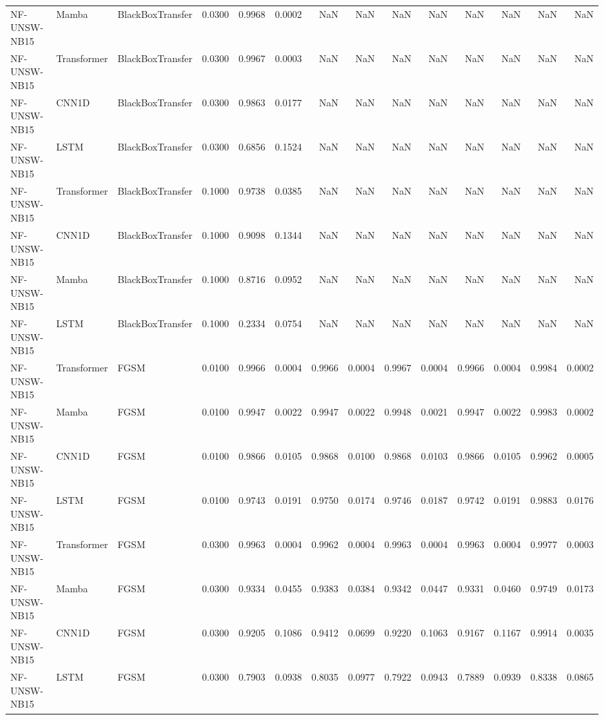 \begin{table}[ht]
\begin{tabular}{lllrrrrrrrrrrr}
NF-UNSW-NB15 & Mamba & BlackBoxTransfer & 0.0300 & 0.9968 & 0.0002 & NaN & NaN & NaN & NaN & NaN & NaN & NaN & NaN \\
NF-UNSW-NB15 & Transformer & BlackBoxTransfer & 0.0300 & 0.9967 & 0.0003 & NaN & NaN & NaN & NaN & NaN & NaN & NaN & NaN \\
NF-UNSW-NB15 & CNN1D & BlackBoxTransfer & 0.0300 & 0.9863 & 0.0177 & NaN & NaN & NaN & NaN & NaN & NaN & NaN & NaN \\
NF-UNSW-NB15 & LSTM & BlackBoxTransfer & 0.0300 & 0.6856 & 0.1524 & NaN & NaN & NaN & NaN & NaN & NaN & NaN & NaN \\
NF-UNSW-NB15 & Transformer & BlackBoxTransfer & 0.1000 & 0.9738 & 0.0385 & NaN & NaN & NaN & NaN & NaN & NaN & NaN & NaN \\
NF-UNSW-NB15 & CNN1D & BlackBoxTransfer & 0.1000 & 0.9098 & 0.1344 & NaN & NaN & NaN & NaN & NaN & NaN & NaN & NaN \\
NF-UNSW-NB15 & Mamba & BlackBoxTransfer & 0.1000 & 0.8716 & 0.0952 & NaN & NaN & NaN & NaN & NaN & NaN & NaN & NaN \\
NF-UNSW-NB15 & LSTM & BlackBoxTransfer & 0.1000 & 0.2334 & 0.0754 & NaN & NaN & NaN & NaN & NaN & NaN & NaN & NaN \\
NF-UNSW-NB15 & Transformer & FGSM & 0.0100 & 0.9966 & 0.0004 & 0.9966 & 0.0004 & 0.9967 & 0.0004 & 0.9966 & 0.0004 & 0.9984 & 0.0002 \\
NF-UNSW-NB15 & Mamba & FGSM & 0.0100 & 0.9947 & 0.0022 & 0.9947 & 0.0022 & 0.9948 & 0.0021 & 0.9947 & 0.0022 & 0.9983 & 0.0002 \\
NF-UNSW-NB15 & CNN1D & FGSM & 0.0100 & 0.9866 & 0.0105 & 0.9868 & 0.0100 & 0.9868 & 0.0103 & 0.9866 & 0.0105 & 0.9962 & 0.0005 \\
NF-UNSW-NB15 & LSTM & FGSM & 0.0100 & 0.9743 & 0.0191 & 0.9750 & 0.0174 & 0.9746 & 0.0187 & 0.9742 & 0.0191 & 0.9883 & 0.0176 \\
NF-UNSW-NB15 & Transformer & FGSM & 0.0300 & 0.9963 & 0.0004 & 0.9962 & 0.0004 & 0.9963 & 0.0004 & 0.9963 & 0.0004 & 0.9977 & 0.0003 \\
NF-UNSW-NB15 & Mamba & FGSM & 0.0300 & 0.9334 & 0.0455 & 0.9383 & 0.0384 & 0.9342 & 0.0447 & 0.9331 & 0.0460 & 0.9749 & 0.0173 \\
NF-UNSW-NB15 & CNN1D & FGSM & 0.0300 & 0.9205 & 0.1086 & 0.9412 & 0.0699 & 0.9220 & 0.1063 & 0.9167 & 0.1167 & 0.9914 & 0.0035 \\
NF-UNSW-NB15 & LSTM & FGSM & 0.0300 & 0.7903 & 0.0938 & 0.8035 & 0.0977 & 0.7922 & 0.0943 & 0.7889 & 0.0939 & 0.8338 & 0.0865 \\

\end{tabular}
\end{table}
